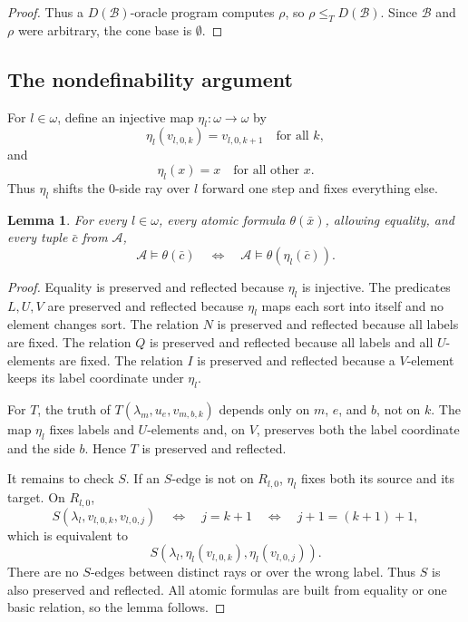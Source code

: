 \documentclass[12pt]{article}
\newtheorem{lemma}[theorem]{Lemma}
\theoremstyle{definition}
\theoremstyle{remark}
\begin{document}
\begin{proof}
Thus a \(D(\mathcal B)\)-oracle program computes \(\rho\), so \(\rho\leq_TD(\mathcal B)\).  Since \(\mathcal B\) and \(\rho\) were arbitrary, the cone base is \(\emptyset\).
\end{proof}

\subsection{The nondefinability argument}\label{sec:nondef}

For \(l\in\omega\), define an injective map \(\eta_l:\omega\to\omega\) by
\[
\eta_l(v_{l,0,k})=v_{l,0,k+1}
\quad\text{for all }k,
\]
and
\[
\eta_l(x)=x
\quad\text{for all other }x.
\]
Thus \(\eta_l\) shifts the \(0\)-side ray over \(l\) forward one step and fixes everything else.

\begin{lemma}\label{lem:eta-atomic}
For every \(l\in\omega\), every atomic formula \(\theta(\bar x)\), allowing equality, and every tuple \(\bar c\) from \(\mathcal A\),
\[
\mathcal A\models \theta(\bar c)
\quad\Longleftrightarrow\quad
\mathcal A\models \theta(\eta_l(\bar c)).
\]
\end{lemma}

\begin{proof}
Equality is preserved and reflected because \(\eta_l\) is injective.  The predicates \(L,U,V\) are preserved and reflected because \(\eta_l\) maps each sort into itself and no element changes sort.  The relation \(N\) is preserved and reflected because all labels are fixed.  The relation \(Q\) is preserved and reflected because all labels and all \(U\)-elements are fixed.  The relation \(I\) is preserved and reflected because a \(V\)-element keeps its label coordinate under \(\eta_l\).

For \(T\), the truth of \(T(\lambda_m,u_e,v_{m,b,k})\) depends only on \(m\), \(e\), and \(b\), not on \(k\).  The map \(\eta_l\) fixes labels and \(U\)-elements and, on \(V\), preserves both the label coordinate and the side \(b\).  Hence \(T\) is preserved and reflected.

It remains to check \(S\).  If an \(S\)-edge is not on \(R_{l,0}\), \(\eta_l\) fixes both its source and its target.  On \(R_{l,0}\),
\[
S(\lambda_l,v_{l,0,k},v_{l,0,j})
\quad\Longleftrightarrow\quad
j=k+1
\quad\Longleftrightarrow\quad
j+1=(k+1)+1,
\]
which is equivalent to
\[
S(\lambda_l,\eta_l(v_{l,0,k}),\eta_l(v_{l,0,j})).
\]
There are no \(S\)-edges between distinct rays or over the wrong label.  Thus \(S\) is also preserved and reflected.  All atomic formulas are built from equality or one basic relation, so the lemma follows.
\end{proof}
\end{document}
